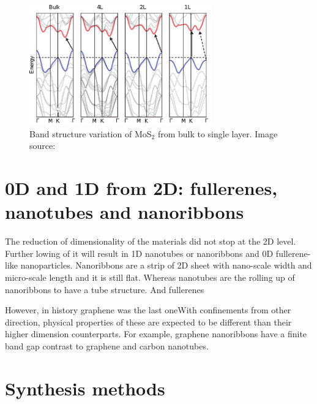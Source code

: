\begin{figure}[htbp!] 
\centering  
\includegraphics[width=0.7\textwidth]{tmds_bands.eps}
\caption{Band structure variation of MoS$_2$ from bulk to single layer. Image source: \cite{Chhowalla2013}}  
\label{fig:tmds_bands}
\end{figure} 


\section{0D and 1D from 2D: fullerenes, nanotubes and nanoribbons}

The reduction of dimensionality of the materials did not stop at the 2D level. Further lowing of it will result in 1D nanotubes or nanoribbons and 0D fullerene-like nanoparticles. Nanoribbons are a strip of 2D sheet with nano-scale width and micro-scale length and it is still flat. Whereas nanotubes are the rolling up of nanoribbons to have a tube structure. And fullerenes 


However, in history graphene was the last oneWith confinements from other direction, physical properties of these are expected to be different than their higher dimension counterparts. For example, graphene nanoribbons have a finite band gap contrast to graphene and carbon nanotubes. 

\section{Synthesis methods}
